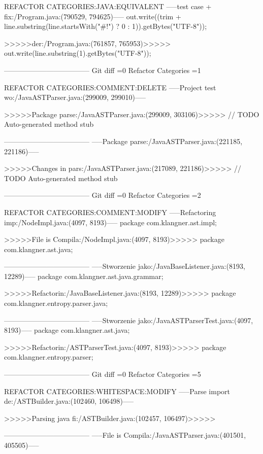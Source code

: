 {{{{{{{{{{{REFACTOR CATEGORIES:JAVA:EQUIVALENT
-----test case + fix:/Program.java:(790529, 794625)-----
			out.write((trim + line.substring(line.startsWith("#!") ? 0 : 1)).getBytes("UTF-8"));
	
>>>>>der:/Program.java:(761857, 765953)>>>>>
			out.write(line.substring(1).getBytes("UTF-8"));
	
------------------------------------
Git diff =0  Refactor Categories =1

REFACTOR CATEGORIES:COMMENT:DELETE
-----Project test wo:/JavaASTParser.java:(299009, 299010)-----
		
>>>>>Package parse:/JavaASTParser.java:(299009, 303106)>>>>>
		// TODO Auto-generated method stub
		
------------------------------------
-----Package parse:/JavaASTParser.java:(221185, 221186)-----
		
>>>>>Changes in pars:/JavaASTParser.java:(217089, 221186)>>>>>
		// TODO Auto-generated method stub
		
------------------------------------
Git diff =0  Refactor Categories =2

REFACTOR CATEGORIES:COMMENT:MODIFY
-----Refactoring imp:/NodeImpl.java:(4097, 8193)-----
package com.klangner.ast.impl;


>>>>>File is Compila:/NodeImpl.java:(4097, 8193)>>>>>
package com.klangner.ast.java;


------------------------------------
-----Stworzenie jako:/JavaBaseListener.java:(8193, 12289)-----
package com.klangner.ast.java.grammar;


>>>>>Refactorin:/JavaBaseListener.java:(8193, 12289)>>>>>
package com.klangner.entropy.parser.java;


------------------------------------
-----Stworzenie jako:/JavaASTParserTest.java:(4097, 8193)-----
package com.klangner.ast.java;


>>>>>Refactorin:/ASTParserTest.java:(4097, 8193)>>>>>
package com.klangner.entropy.parser;


------------------------------------
Git diff =0  Refactor Categories =5

REFACTOR CATEGORIES:WHITESPACE:MODIFY
-----Parse import de:/ASTBuilder.java:(102460, 106498)-----

		
>>>>>Parsing java fi:/ASTBuilder.java:(102457, 106497)>>>>>

	
------------------------------------
-----File is Compila:/JavaASTParser.java:(401501, 405505)-----

}}}}}}}}}}}
